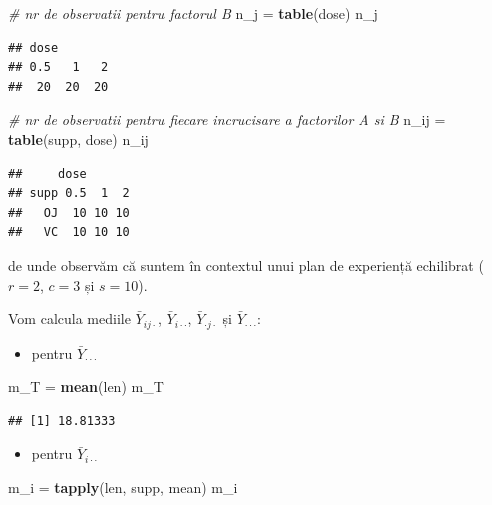 \documentclass[]{article}
\newenvironment{Shaded}{\begin{snugshade}}{\end{snugshade}}
\newcommand{\KeywordTok}[1]{\textcolor[rgb]{0.13,0.29,0.53}{\textbf{{#1}}}}
\newcommand{\StringTok}[1]{\textcolor[rgb]{0.31,0.60,0.02}{{#1}}}
\newcommand{\CommentTok}[1]{\textcolor[rgb]{0.56,0.35,0.01}{\textit{{#1}}}}
\newcommand{\NormalTok}[1]{{#1}}
\providecommand{\tightlist}{%
  \setlength{\itemsep}{0pt}\setlength{\parskip}{0pt}}
\begin{document}
\begin{Shaded}
\begin{Highlighting}[]
\CommentTok{# nr de observatii pentru factorul B}
\NormalTok{n_j =}\StringTok{ }\KeywordTok{table}\NormalTok{(dose)}
\NormalTok{n_j}
\end{Highlighting}
\end{Shaded}

\begin{verbatim}
## dose
## 0.5   1   2 
##  20  20  20
\end{verbatim}

\begin{Shaded}
\begin{Highlighting}[]
\CommentTok{# nr de observatii pentru fiecare incrucisare a factorilor A si B}
\NormalTok{n_ij =}\StringTok{ }\KeywordTok{table}\NormalTok{(supp, dose)}
\NormalTok{n_ij}
\end{Highlighting}
\end{Shaded}

\begin{verbatim}
##     dose
## supp 0.5  1  2
##   OJ  10 10 10
##   VC  10 10 10
\end{verbatim}

de unde observăm că suntem în contextul unui plan de experiență
echilibrat (\(r = 2\), \(c = 3\) și \(s = 10\)).

Vom calcula mediile \(\bar{Y}_{i j\cdot}\), \(\bar{Y}_{i \cdot\cdot}\),
\(\bar{Y}_{\cdot j\cdot}\) și \(\bar{Y}_{\cdot\cdot\cdot}\):

\begin{itemize}
\tightlist
\item
  pentru \(\bar{Y}_{\cdot\cdot\cdot}\)
\end{itemize}

\begin{Shaded}
\begin{Highlighting}[]
\NormalTok{m_T =}\StringTok{ }\KeywordTok{mean}\NormalTok{(len)}
\NormalTok{m_T}
\end{Highlighting}
\end{Shaded}

\begin{verbatim}
## [1] 18.81333
\end{verbatim}

\begin{itemize}
\tightlist
\item
  pentru \(\bar{Y}_{i \cdot\cdot}\)
\end{itemize}

\begin{Shaded}
\begin{Highlighting}[]
\NormalTok{m_i =}\StringTok{ }\KeywordTok{tapply}\NormalTok{(len, supp, mean)}
\NormalTok{m_i}
\end{Highlighting}
\end{Shaded}
\end{document}
